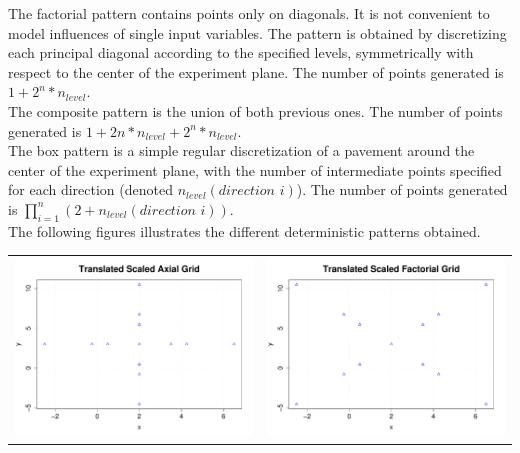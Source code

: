 {  The  factorial pattern contains points only on diagonals. It is not convenient to model influences of single input variables. The pattern is obtained by discretizing each principal diagonal according to the specified levels, symmetrically with respect to the center of the experiment plane. The number of points generated is $1 +  2^n*n_{level}$.\\

  The composite pattern is the union of both previous ones. The number of points generated is $1 + 2n*n_{level} +  2^n*n_{level}$.\\

  The box pattern is a simple regular discretization of a pavement around the center of the experiment plane,  with the number of intermediate points specified for each direction (denoted $n_{level}(direction \, \, i)$).  The number of points generated is $\displaystyle \prod_{i=1}^{n} (2+n_{level}(direction \, \, i))$.\\

  The following figures illustrates the different deterministic patterns obtained.

  \newpage
  \begin{center}
    \begin{tabular}{cc}
      \includegraphics[width=8cm]{TranslatedScaledAxialGrid.pdf} &   \includegraphics[width=8cm]{TranslatedScaledFactorialGrid.pdf}
    \end{tabular}
  \end{center}


}
